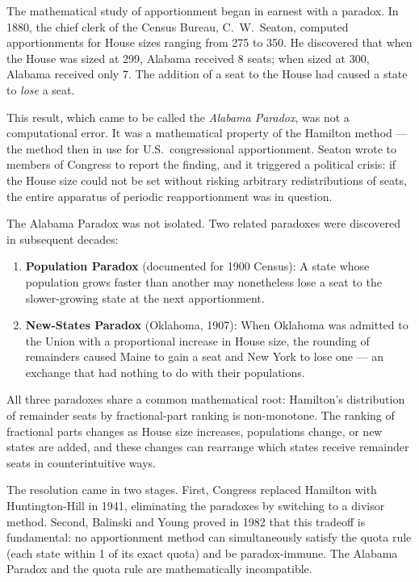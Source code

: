 The mathematical study of apportionment began in earnest with a paradox.
In 1880, the chief clerk of the Census Bureau, C.\ W.\ Seaton, computed
apportionments for House sizes ranging from 275 to 350.
He discovered that when the House was sized at 299, Alabama received 8 seats;
when sized at 300, Alabama received only 7.
The addition of a seat to the House had caused a state to \emph{lose} a seat.

This result, which came to be called the \emph{Alabama Paradox},
was not a computational error.
It was a mathematical property of the Hamilton method --- the method
then in use for U.S.\ congressional apportionment.
Seaton wrote to members of Congress to report the finding,
and it triggered a political crisis: if the House size could not be
set without risking arbitrary redistributions of seats,
the entire apparatus of periodic reapportionment was in question.

The Alabama Paradox was not isolated.
Two related paradoxes were discovered in subsequent decades:
\begin{enumerate}
  \item \textbf{Population Paradox} (documented for 1900 Census):
    A state whose population grows faster than another may nonetheless
    lose a seat to the slower-growing state at the next apportionment.
  \item \textbf{New-States Paradox} (Oklahoma, 1907):
    When Oklahoma was admitted to the Union with a proportional increase
    in House size, the rounding of remainders caused Maine to gain a
    seat and New York to lose one --- an exchange that had nothing to
    do with their populations.
\end{enumerate}

All three paradoxes share a common mathematical root: Hamilton's
distribution of remainder seats by fractional-part ranking is
non-monotone.
The ranking of fractional parts changes as House size increases,
populations change, or new states are added, and these changes can
rearrange which states receive remainder seats in counterintuitive ways.

The resolution came in two stages.
First, Congress replaced Hamilton with Huntington-Hill in 1941,
eliminating the paradoxes by switching to a divisor method.
Second, Balinski and Young \citeyearpar{balinski1982fair} proved in 1982
that this tradeoff is fundamental: no apportionment method can simultaneously
satisfy the quota rule (each state within 1 of its exact quota) and be
paradox-immune.
The Alabama Paradox and the quota rule are mathematically incompatible.


